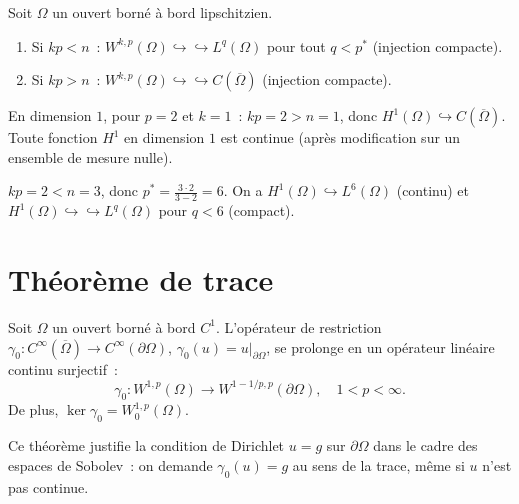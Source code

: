 \begin{theoreme}
\label{thm:rellich}
Soit $\Omega$ un ouvert born\'e \`a bord lipschitzien.
\begin{enumerate}
    \item Si $kp < n$~: $W^{k,p}(\Omega) \hookrightarrow\hookrightarrow L^q(\Omega)$
          pour tout $q < p^*$ (injection compacte).
    \item Si $kp > n$~: $W^{k,p}(\Omega) \hookrightarrow\hookrightarrow C(\overline{\Omega})$
          (injection compacte).
\end{enumerate}
\end{theoreme}

\begin{exemple}[Cas $n = 1$]
En dimension $1$, pour $p = 2$ et $k = 1$~: $kp = 2 > n = 1$, donc
$H^1(\Omega) \hookrightarrow C(\overline{\Omega})$. Toute fonction $H^1$ en
dimension $1$ est continue (apr\`es modification sur un ensemble de mesure nulle).
\end{exemple}

\begin{exemple}[Cas $n = 3$, $k = 1$, $p = 2$]
$kp = 2 < n = 3$, donc $p^* = \frac{3 \cdot 2}{3 - 2} = 6$.
On a $H^1(\Omega) \hookrightarrow L^6(\Omega)$ (continu) et
$H^1(\Omega) \hookrightarrow\hookrightarrow L^q(\Omega)$ pour $q < 6$ (compact).
\end{exemple}

\section{Th\'eor\`eme de trace}

\begin{theoreme}[Trace]
\label{thm:trace}
Soit $\Omega$ un ouvert born\'e \`a bord $C^1$. L'op\'erateur de restriction
$\gamma_0 : C^\infty(\overline{\Omega}) \to C^\infty(\partial\Omega)$,
$\gamma_0(u) = u|_{\partial\Omega}$, se prolonge en un op\'erateur lin\'eaire
continu surjectif~:
\[
    \gamma_0 : W^{1,p}(\Omega) \to W^{1-1/p, p}(\partial\Omega),
    \quad 1 < p < \infty.
\]
De plus, $\ker \gamma_0 = W_0^{1,p}(\Omega)$.
\end{theoreme}

\begin{remarque}
Ce th\'eor\`eme justifie la condition de Dirichlet $u = g$ sur $\partial\Omega$
dans le cadre des espaces de Sobolev~: on demande $\gamma_0(u) = g$ au sens de
la trace, m\^eme si $u$ n'est pas continue.
\end{remarque}

